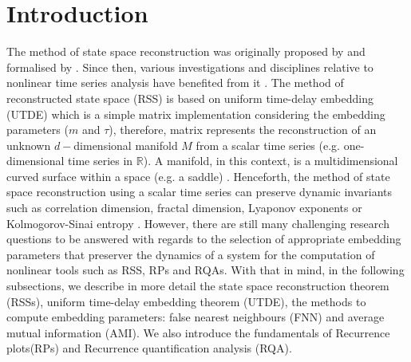 \section{Introduction}
The method of state space reconstruction was originally proposed by 
\cite{packard1980} and formalised by \cite{takens1981}. Since then, various 
investigations and disciplines relative to nonlinear time series analysis 
have benefited from it \citep{aguirre2009, stergiou2011, frank2010, sama2013}.
The method of reconstructed state space (RSS) is based on uniform time-delay 
embedding (UTDE) which is a simple matrix implementation considering the 
embedding 
parameters ($m$ and $\tau$), therefore, matrix represents the reconstruction
of an unknown $d-$dimensional manifold $M$ from a scalar 
time series (e.g. one-dimensional time series in $\mathbb{R}$).
A manifold, in this context, is a multidimensional curved surface within a 
space (e.g. a saddle) \citep{guastello-gregson2011}.
Henceforth, the method of state space reconstruction using a scalar time series 
can preserve dynamic invariants such as correlation dimension, 
fractal dimension, Lyaponov exponents or Kolmogorov-Sinai entropy 
\citep{bradley2015, Quintana-Duque2012, 
Quintana-Duque2013, Quintana-Duque2016, krakovska2015}.
However, 
there are still many challenging research questions to be answered  
with regards to the selection of appropriate embedding parameters 
that preserver the dynamics of a system 
for the computation of nonlinear tools such as RSS, RPs and RQAs.
With that in mind, in the following subsections, we describe in more 
detail the state space 
reconstruction theorem (RSSs), uniform time-delay embedding theorem (UTDE),
the methods to compute embedding parameters: false nearest neighbours (FNN)
and average mutual information (AMI).
We also introduce the fundamentals of Recurrence plots(RPs) and 
Recurrence quantification analysis (RQA).

